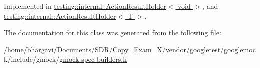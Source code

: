 Implemented in \hyperlink{classtesting_1_1internal_1_1_action_result_holder_3_01void_01_4_a6729c4fe6c33485ece4fbcfea8806e49}{testing\+::internal\+::\+Action\+Result\+Holder$<$ void $>$}, and \hyperlink{classtesting_1_1internal_1_1_action_result_holder_a70989192d3ed669c059a7e29c4a7b9fc}{testing\+::internal\+::\+Action\+Result\+Holder$<$ T $>$}.



The documentation for this class was generated from the following file\+:\begin{DoxyCompactItemize}
\item 
/home/bhargavi/\+Documents/\+S\+D\+R/\+Copy\+\_\+\+Exam\+\_\+X/vendor/googletest/googlemock/include/gmock/\hyperlink{gmock-spec-builders_8h}{gmock-\/spec-\/builders.\+h}\end{DoxyCompactItemize}
